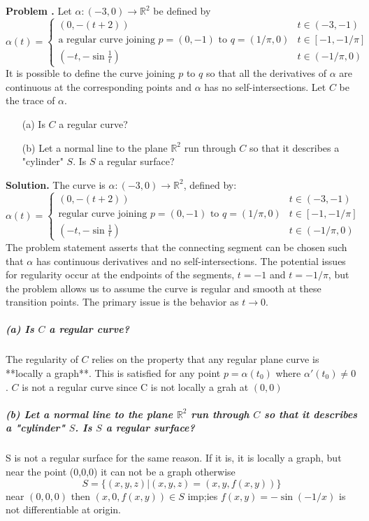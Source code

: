 \documentclass[12pt, a4paper, oneside]{article}
\newcounter{problemname}
\newenvironment{problems}
  {\begin{shaded}\stepcounter{problemname}\par\noindent\textbf{Problem \arabic{problemname}. }\newline}
  {\end{shaded}\par}
\newenvironment{solution}
  {\par\noindent\textbf{Solution. }\newline}
  {\par}
\begin{document}
\begin{problems}
Let $\alpha:(-3,0)\longrightarrow \mathbb{R}^{2}$ be defined by
$$ \alpha(t) = \begin{cases} 
      (0, -(t+2)) & t\in(-3,-1) \\
      \text{a regular curve joining } p=(0,-1) \text{ to } q=(1/\pi,0) & t\in[-1,-1/\pi] \\
      (-t,-\sin\frac{1}{t}) & t\in(-1/\pi,0)
   \end{cases}
$$
It is possible to define the curve joining $p$ to $q$ so that all the derivatives of $\alpha$ are continuous at the corresponding points and $\alpha$ has no self-intersections. Let $C$ be the trace of $\alpha$.
\begin{enumerate}
    \item[(a)] Is $C$ a regular curve?
    \item[(b)] Let a normal line to the plane $\mathbb{R}^{2}$ run through $C$ so that it describes a "cylinder" $S$. Is $S$ a regular surface?
\end{enumerate}
\end{problems}

\begin{solution}
The curve is $\alpha:(-3,0)\longrightarrow \mathbb{R}^{2}$, defined by:
$$ \alpha(t) = \begin{cases}
      (0, -(t+2)) & t\in(-3,-1) \\
      \text{regular curve joining } p=(0,-1) \text{ to } q=(1/\pi,0) & t\in[-1,-1/\pi] \\
      (-t,-\sin\frac{1}{t}) & t\in(-1/\pi,0)
   \end{cases}
$$
The problem statement asserts that the connecting segment can be chosen such that $\alpha$ has continuous derivatives and no self-intersections. The potential issues for regularity occur at the endpoints of the segments, $t=-1$ and $t=-1/\pi$, but the problem allows us to assume the curve is regular and smooth at these transition points. The primary issue is the behavior as $t \to 0$.

 \subparagraph{(a) Is $C$ a regular curve?}
The regularity of $C$ relies on the property that any regular plane curve is **locally a graph**. This is satisfied for any point $p = \alpha(t_0)$ where $\alpha'(t_0) \neq 0$.
$C$ is not a regular curve since C is not locally a grah at $(0,0)$
 \subparagraph{(b) Let a normal line to the plane $\mathbb{R}^{2}$ run through $C$ so that it describes a "cylinder" $S$. Is $S$ a regular surface?}

S is not a regular surface for the same reason. If it is, it is locally a graph, but near the point (0,0,0) it can not be a graph otherwise \[ S=\{(x,y,z)|(x,y,z)=(x,y,f(x,y))\} \] near $(0,0,0)$ then $(x,0,f(x,y))\in S$ imp;ies $f(x,y)=-\sin (-1/x)$ is not differentiable at origin.
\end{solution}
\end{document}
